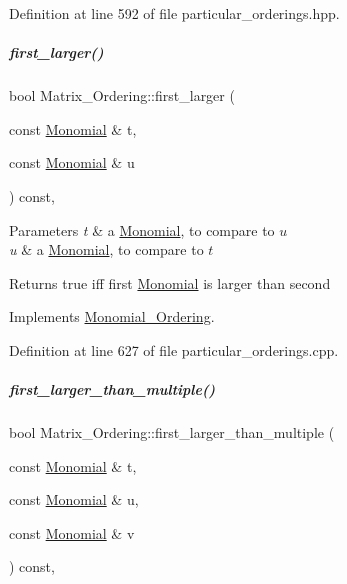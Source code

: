 Definition at line 592 of file particular\+\_\+orderings.\+hpp.

\mbox{\label{group__orderinggroup_aed327b2dfb248ac239694717c3313e31}} 
\subparagraph{\texorpdfstring{first\+\_\+larger()}{first\_larger()}}
{\footnotesize\ttfamily bool Matrix\+\_\+\+Ordering\+::first\+\_\+larger (\begin{DoxyParamCaption}\item[{const \hyperlink{group__polygroup_class_monomial}{Monomial} \&}]{t,  }\item[{const \hyperlink{group__polygroup_class_monomial}{Monomial} \&}]{u }\end{DoxyParamCaption}) const\hspace{0.3cm}{\ttfamily [override]}, {\ttfamily [virtual]}}


\begin{DoxyParams}{Parameters}
{\em t} & a \hyperlink{group__polygroup_class_monomial}{Monomial}, to compare to $ u $ \\
\hline
{\em u} & a \hyperlink{group__polygroup_class_monomial}{Monomial}, to compare to $ t $ \\
\hline
\end{DoxyParams}
\begin{DoxyReturn}{Returns}
{\ttfamily true} iff first \hyperlink{group__polygroup_class_monomial}{Monomial} is larger than second 
\end{DoxyReturn}


Implements \hyperlink{group__orderinggroup_aed41fe82e1ca5cd287a93d287fee7c20}{Monomial\+\_\+\+Ordering}.



Definition at line 627 of file particular\+\_\+orderings.\+cpp.

\mbox{\label{group__orderinggroup_ad9be3dafe786d480521cc0a31ebdef8c}} 
\subparagraph{\texorpdfstring{first\+\_\+larger\+\_\+than\+\_\+multiple()}{first\_larger\_than\_multiple()}}
{\footnotesize\ttfamily bool Matrix\+\_\+\+Ordering\+::first\+\_\+larger\+\_\+than\+\_\+multiple (\begin{DoxyParamCaption}\item[{const \hyperlink{group__polygroup_class_monomial}{Monomial} \&}]{t,  }\item[{const \hyperlink{group__polygroup_class_monomial}{Monomial} \&}]{u,  }\item[{const \hyperlink{group__polygroup_class_monomial}{Monomial} \&}]{v }\end{DoxyParamCaption}) const\hspace{0.3cm}{\ttfamily [override]}, {\ttfamily [virtual]}}


